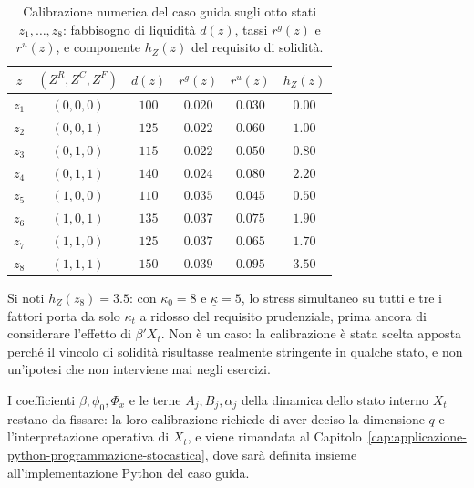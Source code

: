 \begin{table}[ht]
\centering
\begin{tabular}{|c|c|c|c|c|c|}
\hline
$z$ & $(Z^R,Z^C,Z^F)$ & $d(z)$ & $r^g(z)$ & $r^u(z)$ & $h_Z(z)$\\
\hline
$z_1$ & $(0,0,0)$ & $100$ & $0.020$ & $0.030$ & $0.00$\\
$z_2$ & $(0,0,1)$ & $125$ & $0.022$ & $0.060$ & $1.00$\\
$z_3$ & $(0,1,0)$ & $115$ & $0.022$ & $0.050$ & $0.80$\\
$z_4$ & $(0,1,1)$ & $140$ & $0.024$ & $0.080$ & $2.20$\\
$z_5$ & $(1,0,0)$ & $110$ & $0.035$ & $0.045$ & $0.50$\\
$z_6$ & $(1,0,1)$ & $135$ & $0.037$ & $0.075$ & $1.90$\\
$z_7$ & $(1,1,0)$ & $125$ & $0.037$ & $0.065$ & $1.70$\\
$z_8$ & $(1,1,1)$ & $150$ & $0.039$ & $0.095$ & $3.50$\\
\hline
\end{tabular}
\caption{Calibrazione numerica del caso guida sugli otto stati $z_1,\ldots,z_8$: fabbisogno di liquidit\`{a} $d(z)$, tassi $r^g(z)$ e $r^u(z)$, e componente $h_Z(z)$ del requisito di solidit\`{a}.}
\label{tab:cap15-calibrazione-otto-stati}
\end{table}

\begin{remark}

Si noti $h_Z(z_8)=3.5$: con $\kappa_0=8$ e $\underline\kappa=5$, lo stress
simultaneo su tutti e tre i fattori porta da solo $\kappa_t$ a ridosso del
requisito prudenziale, prima ancora di considerare l'effetto di
$\beta'X_t$. Non \`e un caso: la calibrazione \`e stata scelta apposta
perch\'e il vincolo di solidit\`a risultasse realmente stringente in
qualche stato, e non un'ipotesi che non interviene mai negli esercizi.

\end{remark}

I coefficienti $\beta,\phi_0,\Phi_x$ e le terne $A_j,B_j,\alpha_j$ della
dinamica dello stato interno $X_t$ restano da fissare: la loro calibrazione
richiede di aver deciso la dimensione $q$ e l'interpretazione operativa di
$X_t$, e viene rimandata al
Capitolo~\ref{cap:applicazione-python-programmazione-stocastica}, dove
sar\`a definita insieme all'implementazione Python del caso guida.

